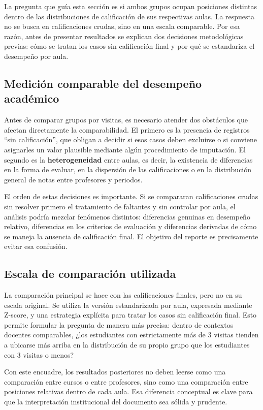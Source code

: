 \documentclass[8pt,a4paper]{article} %
\numberwithin{figure}{subsection}
\begin{document}
La pregunta que guía esta sección es si ambos grupos ocupan posiciones distintas dentro de las distribuciones de calificación de sus respectivas aulas. La respuesta no se busca en calificaciones crudas, sino en una escala comparable. Por esa razón, antes de presentar resultados se explican dos decisiones metodológicas previas: cómo se tratan los casos sin calificación final y por qué se estandariza el desempeño por aula.

\subsection{Medición comparable del desempeño académico}
Antes de comparar grupos por visitas, es necesario atender dos obstáculos que afectan directamente la comparabilidad. El primero es la presencia de registros ``sin calificación'', que obligan a decidir si esos casos deben excluirse o si conviene asignarles un valor plausible mediante algún procedimiento de imputación. El segundo es la \textbf{heterogeneidad} entre aulas, es decir, la existencia de diferencias en la forma de evaluar, en la dispersión de las calificaciones o en la distribución general de notas entre profesores y periodos.

El orden de estas decisiones es importante. Si se compararan calificaciones crudas sin resolver primero el tratamiento de faltantes y sin controlar por aula, el análisis podría mezclar fenómenos distintos: diferencias genuinas en desempeño relativo, diferencias en los criterios de evaluación y diferencias derivadas de cómo se maneja la ausencia de calificación final. El objetivo del reporte es precisamente evitar esa confusión.

\subsection{Escala de comparación utilizada}
La comparación principal se hace con las calificaciones finales, pero no en su escala original. Se utiliza la versión estandarizada por aula, expresada mediante Z-score, y una estrategia explícita para tratar los casos sin calificación final. Esto permite formular la pregunta de manera más precisa: dentro de contextos docentes comparables, ¿los estudiantes con estrictamente más de 3 visitas tienden a ubicarse más arriba en la distribución de su propio grupo que los estudiantes con 3 visitas o menos?

Con este encuadre, los resultados posteriores no deben leerse como una comparación entre cursos o entre profesores, sino como una comparación entre posiciones relativas dentro de cada aula. Esa diferencia conceptual es clave para que la interpretación institucional del documento sea sólida y prudente.
\end{document}

